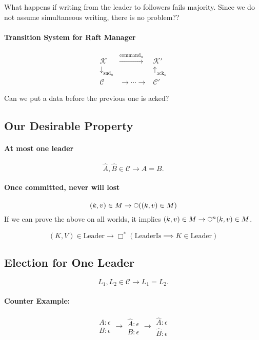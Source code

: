 \documentclass[sigconf,nonacm]{acmart}
\newcommand{\red}[1]{{\color{red}#1}}
\def\mcirc{\mathord{\scalerel*{\bigcirc}{t}}}
\begin{document}
What happens if writing from the leader to followers fails majority.
Since we do not assume simultaneous writing, there is no problem??

\paragraph{Transition System for Raft Manager}
\[
\begin{array}{ccc}
\mathcal{K}  & \xrightarrow{ \text{command}_n } & \mathcal{K'} \\
\downarrow_{\text{snd}_{n}} & & \uparrow_{\text{ack}_n} \\
\mathcal{C} & \to \cdots \to & \mathcal{C'}
\end{array}
\]

\red{Can we put a data before the previous one is acked?}

\subsection{Our Desirable Property}
\paragraph{At most one leader}
\[
\hat{A}, \hat{B} \in \mathcal{C} \to A = B.
\]

\paragraph{Once committed, never will lost}
\[
(k, v) \in M \to \mcirc((k, v) \in M)
\]
If we can prove the above on all worlds, it implies $(k, v) \in M \to \mcirc^n (k, v) \in M$.

\[
(K, V) \in \text{Leader} \to \Box^*(\text{LeaderIs} \implies K \in \text{Leader})
\]

\subsection{Election for One Leader}
\[
L_1, L_2 \in \mathcal{C} \to L_1 = L_2.
\]

\paragraph{Counter Example:}
\[
\begin{array}{l}
A: \epsilon \\
B: \epsilon
\end{array} \to
\begin{array}{l}
\hat{A}: \epsilon \\
B: \epsilon
\end{array} \to
\begin{array}{l}
\hat{A}: \epsilon \\
\hat{B}: \epsilon
\end{array}
\]
\end{document}
